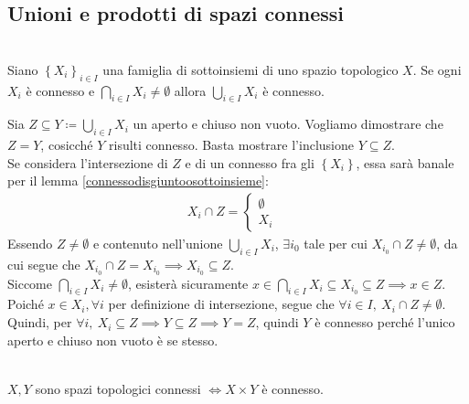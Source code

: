 \subsection{Unioni e prodotti di spazi connessi}
\begin{theorema}~{}\label{unione sottospazi connessi}\\
Siano $\left\{ X_i \right\}_{i\in I}$ una famiglia di sottoinsiemi di uno spazio topologico $X$. Se ogni $X_i$ è connesso e $\displaystyle\bigcap_{i\in I}X_i\neq\emptyset$ allora $\displaystyle\bigcup_{i\in I}X_i$ è connesso.	
\end{theorema}
\begin{demonstration}
	Sia $\displaystyle Z\subseteq Y\coloneqq \bigcup_{i\in I}X_i$ un aperto e chiuso non vuoto. Vogliamo dimostrare che $Z=Y$, cosicché $Y$ risulti connesso. Basta mostrare l'inclusione $Y\subseteq Z$.\\
	Se considera l'intersezione di $Z$ e di un connesso fra gli $\left\{X_i\right\}$, essa sarà banale per il lemma \ref{connessodisgiuntoosottoinsieme}:
	\begin{gather*}
		X_i \cap Z = \begin{cases}
			\emptyset & \\
			X_i	&		
		\end{cases}
	\end{gather*}
	Essendo $Z\neq\emptyset$ e contenuto nell'unione $\displaystyle \bigcup_{i\in I}X_i$, $\exists i_0$ tale per cui $X_{i_0}\cap Z\neq \emptyset$, da cui segue che $X_{i_0}\cap Z=X_{i_0} \implies X_{i_0}\subseteq Z $.\\
	Siccome $\displaystyle \bigcap_{i\in I}X_i\neq\emptyset$, esisterà sicuramente $x\in\bigcap_{i\in I}X_i\subseteq X_{i_0}\subseteq Z \implies x\in Z$. Poiché $x\in X_i, \forall i$ per definizione di intersezione, segue che $\forall i\in I, \ X_i\cap Z\neq\emptyset$. Quindi, per $\forall i,\ X_i\subseteq Z \implies Y\subseteq Z \implies Y=Z$, quindi $Y$ è connesso perché l'unico aperto e chiuso non vuoto è se stesso.
\end{demonstration}
\begin{theorema}~{}\label{prodotto connessi}\\
$X, Y$ sono spazi topologici connessi $\iff X\times Y$ è connesso.	
\end{theorema}
